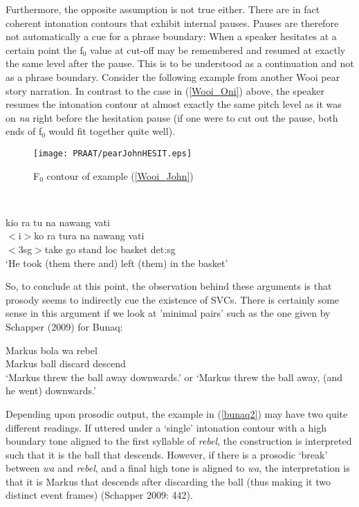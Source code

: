 Furthermore, the opposite assumption is not true either. There are in fact coherent intonation contours that exhibit internal pauses. Pauses are therefore not automatically a cue for a phrase boundary: When a speaker hesitates at a certain point the f$_0$ value at cut-off may be remembered and resumed at exactly the same level after the pause. This is to be understood as a continuation and not as a phrase boundary. Consider the following example from another Wooi pear story narration. In contrast to the case in (\ref{Wooi_Oni}) above, the speaker resumes the intonation contour at almost exactly the same pitch level as it was on \textit{na} right before the hesitation pause (if one were to cut out the pause, both ends of f$_0$ would fit together quite well).

\begin{figure}

\texttt{[image: PRAAT/pearJohnHESIT.eps]} 
\caption{F$_0$ contour of example (\ref{Wooi_John})}\label{fig:Wooi_John}

\end{figure}
\

\ea \label{Wooi_John}
\gll kio ra tu na  nawang vati \\
$<$i$>$ko ra tura na nawang vati \\
\glc $<$3\acs{sg}$>$take go stand \acs{loc} basket \acs{det}:\acs{sg} \\
\glft `He took (them there and) left (them) in the basket' \\ 
\z
\xe

So, to conclude at this point, the observation behind these arguments is that prosody seems to indirectly cue the existence of SVCs. There is certainly some sense in this argument if we look at 'minimal pairs' such as the one given by Schapper (2009) for Bunaq:

\ea \label{bunaq2}
\gll Markus bola wa rebel \\
Markus ball discard descend \\
\glft `Markus threw the ball away downwards.’ or `Markus threw the ball away, (and he went) downwards.’  \\ 
\z
\xe

Depending upon prosodic output, the example in (\ref{bunaq2}) may have two quite different readings. If uttered under a `single' intonation contour with a high boundary tone aligned to the first syllable of \textit{rebel}, the construction is interpreted such that it is the ball that descends. However, if there is a prosodic `break' between \textit{wa} and \textit{rebel}, and a final high tone is aligned to \textit{wa}, the interpretation is that it is Markus that descends after discarding the ball (thus making it two distinct event frames) (Schapper 2009: 442).

